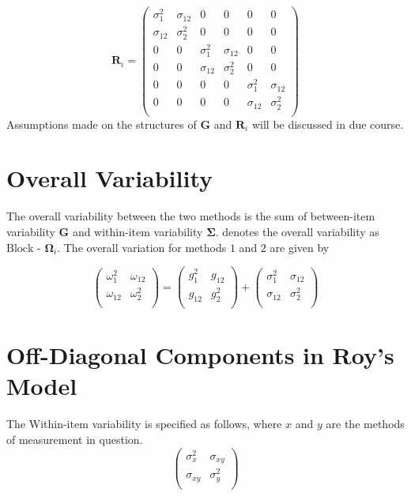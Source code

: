 \documentclass[12pt, a4paper]{report}
\theoremstyle{plain}
\theoremstyle{definition}
\theoremstyle{remark}
\begin{document}
\[
\boldsymbol{R}_i = \left(
\begin{array}{cccccc}
\sigma^2_{1} & \sigma_{12} & 0 & 0 & 0 & 0 \\
\sigma_{12} & \sigma^2_{2} & 0 & 0 & 0 & 0 \\
0 & 0 & \sigma^2_{1} & \sigma_{12} & 0 & 0 \\
0 & 0 & \sigma_{12} & \sigma^2_{2} & 0 & 0 \\
0 & 0 & 0 & 0 & \sigma^2_{1} & \sigma_{12} \\
0 & 0 & 0 & 0 & \sigma_{12} & \sigma^2_{2} \\
\end{array} \right)
\]
Assumptions made on the structures of $\boldsymbol{G}$ and $\boldsymbol{R}_i$ will be discussed in due course.


\section{Overall Variability}
The overall variability between the two methods is the sum of between-item variability
$\boldsymbol{G}$ and within-item variability $\boldsymbol{\Sigma}$. \citet{ARoy2009} denotes the overall variability	as ${\mbox{Block - }\boldsymbol \Omega_{i}}$. The overall variation for methods $1$ and $2$ are given by

\begin{center}
	\[\left(\begin{array}{cc}
	\omega^2_1  & \omega_{12} \\
	\omega_{12} & \omega^2_2 \\
	\end{array}  \right)
	=  \left(
	\begin{array}{cc}
	g^2_1  & g_{12} \\
	g_{12} & g^2_2 \\
	\end{array} \right)+
	\left(
	\begin{array}{cc}
	\sigma^2_1  & \sigma_{12} \\
	\sigma_{12} & \sigma^2_2 \\
	\end{array}\right)
	\]
\end{center}



\section{Off-Diagonal Components in Roy's Model}

The Within-item variability is specified as follows, where $x$ and $y$ are the methods of measurement in question.
\[ \left(
\begin{array}{cc}
\sigma^2_x & \sigma_{xy} \\
\sigma_{xy} & \sigma^2_y \\
\end{array}
\right)
\]
\end{document}
